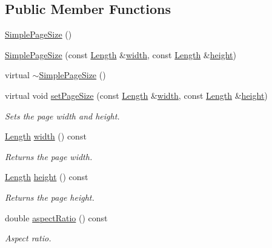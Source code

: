 \subsection*{Public Member Functions}
\begin{DoxyCompactItemize}
\item 
\hyperlink{classSimplePageSize_a5f6b25278399ada555f14eddad80d71c}{Simple\+Page\+Size} ()
\item 
\hyperlink{classSimplePageSize_a05dd70897f569058308036c8d0a1e97f}{Simple\+Page\+Size} (const \hyperlink{classLength}{Length} \&\hyperlink{classSimplePageSize_a5866f4c04635b09ec065a1fc45f9d1df}{width}, const \hyperlink{classLength}{Length} \&\hyperlink{classSimplePageSize_a8df6b43628bff9c8b53f26cc478640c5}{height})
\item 
virtual \hyperlink{classSimplePageSize_a1343f629956b66af2384f433810e941e}{$\sim$\+Simple\+Page\+Size} ()
\item 
virtual void \hyperlink{classSimplePageSize_a8b863b72f20c026b360a28062fb750b5}{set\+Page\+Size} (const \hyperlink{classLength}{Length} \&\hyperlink{classSimplePageSize_a5866f4c04635b09ec065a1fc45f9d1df}{width}, const \hyperlink{classLength}{Length} \&\hyperlink{classSimplePageSize_a8df6b43628bff9c8b53f26cc478640c5}{height})
\begin{DoxyCompactList}\small\item\em Sets the page width and height. \end{DoxyCompactList}\item 
\hyperlink{classLength}{Length} \hyperlink{classSimplePageSize_a5866f4c04635b09ec065a1fc45f9d1df}{width} () const 
\begin{DoxyCompactList}\small\item\em Returns the page width. \end{DoxyCompactList}\item 
\hyperlink{classLength}{Length} \hyperlink{classSimplePageSize_a8df6b43628bff9c8b53f26cc478640c5}{height} () const 
\begin{DoxyCompactList}\small\item\em Returns the page height. \end{DoxyCompactList}\item 
double \hyperlink{classSimplePageSize_af8aac78061f212f795c08b332c96b5b4}{aspect\+Ratio} () const 
\begin{DoxyCompactList}\small\item\em Aspect ratio. \end{DoxyCompactList}\item 

\end{DoxyCompactItemize}
